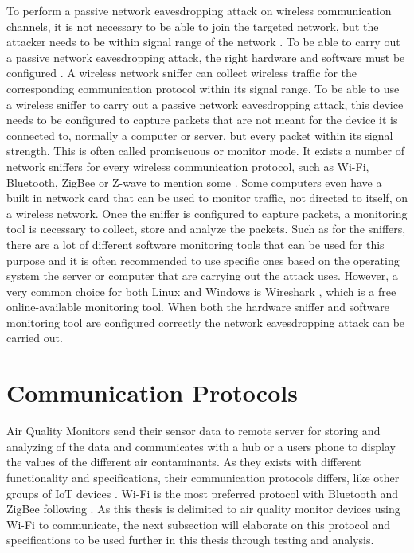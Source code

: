 To perform a passive network eavesdropping attack on wireless communication channels, it is not necessary to be able to join the targeted network, but the attacker needs to be within signal range of the network \cite{WifiEavesdropEnc}. To be able to carry out a passive network eavesdropping attack, the right hardware and software must be configured \cite{Sniffingtech}. A wireless network sniffer can collect wireless traffic for the corresponding communication protocol within its signal range. To be able to use a wireless sniffer to carry out a passive network eavesdropping attack, this device needs to be configured to capture packets that are not meant for the device it is connected to, normally a computer or server, but every packet within its signal strength. This is often called promiscuous or monitor mode. It exists a number of network sniffers for every wireless communication protocol, such as Wi-Fi, Bluetooth, ZigBee or Z-wave to mention some \cite{Sniffingtech}. Some computers even have a built in network card that can be used to monitor traffic, not directed to itself, on a wireless network. Once the sniffer is configured to capture packets, a monitoring tool is necessary to collect, store and analyze the packets. Such as for the sniffers, there are a lot of different software monitoring tools that can be used for this purpose and it is often recommended to use specific ones based on the operating system the server or computer that are carrying out the attack uses. However, a very common choice for both Linux and Windows is Wireshark \cite{Wireshark}, which is a free online-available monitoring tool. When both the hardware sniffer and software monitoring tool are configured correctly the network eavesdropping attack can be carried out. 

\section{Communication Protocols}
Air Quality Monitors send their sensor data to remote server for storing and analyzing of the data and communicates with a hub or a users phone to display the values of the different air contaminants. As they exists with different functionality and specifications, their communication protocols differs, like other groups of IoT devices \cite{AQMBigSource}. Wi-Fi is the most preferred protocol with Bluetooth and ZigBee following \cite{saini2020indoor}. As this thesis is delimited to air quality monitor devices using Wi-Fi to communicate, the next subsection will elaborate on this protocol and specifications to be used further in this thesis through testing and analysis. 

